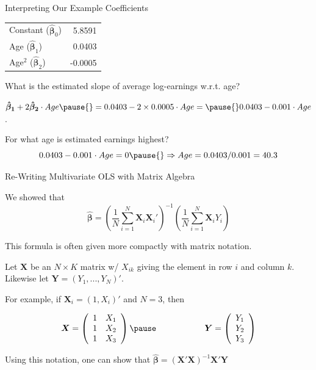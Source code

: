 \documentclass[11pt,english,handout]{beamer}
\newenvironment{wideitemize}{\itemize\addtolength{\itemsep}{10pt}}{\enditemize}
\begin{document}
\begin{frame}{Interpreting Our Example Coefficients}
		\begin{tabular}{lr}
		Constant ($\bm\hat\beta_0$) & 5.8591 \\
		Age ($\bm\hat\beta_1$) & 0.0403 \\
		Age$^2$ ($\bm\hat\beta_2$) & -0.0005
	\end{tabular}
\medskip
	
\begin{wideitemize}
	\item
	What is the estimated slope of average log-earnings w.r.t. age? \pause
	
	\item
	$\bm{\hat\beta_1} + 2 \bm{\hat\beta_2} \cdot Age \pause{} = 0.0403 - 2 \times 0.0005\cdot Age =  \pause{} 0.0403 - 0.001 \cdot Age$.
	
	\pause
	\item
	For what age is estimated earnings highest? \pause
	$$0.0403 - 0.001 \cdot Age = 0 \pause{} \Rightarrow Age = 0.0403 / 0.001 = 40.3 $$
	
\end{wideitemize}	
\end{frame}
	
	\begin{frame}{Re-Writing Multivariate OLS with Matrix Algebra}
		\begin{wideitemize}
		
		\item
		We showed that 
		$$ \bm{\hat\beta} = \left( \frac{1}{N} \sum_{i=1}^N \bm{X}_i \bm{X}_i' \right)^{-1}  \left( \frac{1}{N} \sum_{i=1}^N \bm{X}_i Y_i \right)$$
		
		\item
		This formula is often given more compactly with matrix notation.
		
		\pause
		\item
		Let $\bm{X}$ be an $N \times K$ matrix w/ $X_{ik}$ giving the element in row $i$ and column $k$. \pause Likewise let $\bm{Y} = (Y_1,...,Y_N)'$.
		
		\pause
		\item
		For example, if $\bm{X}_i = (1, X_i)'$ and $N=3$, then
		
		$$\bm{X} = \left( \begin{array}{rr} 1 & X_{1} \\ 1 & X_{2} \\ 1 & X_{3}   \end{array}  \right) \pause \hspace{2cm} \bm{Y} = \left( \begin{array}{r} Y_{1} \\Y_{2} \\ Y_{3}   \end{array}  \right)$$
		
		\pause
		\item
		Using this notation, one can show that $\bm{\hat\beta} = \left(\bm{X'X}\right)^{-1} \bm{X}'\bm{Y}$
	\end{wideitemize}	
		
	\end{frame}
	
\end{document}
